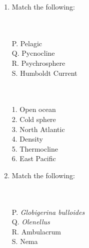 \documentclass[12pt,fleqn]{article}
\theoremstyle{remark}
\begin{document}
\begin{enumerate}[label=Q.\arabic*.]
    \item Match the following: \hfill{} \\
    
\begin{multicols}{2}
            \\\\
            P. Pelagic\\
            Q. Pycnocline\\
            R. Psychrosphere\\
            S. Humboldt Current

            \columnbreak
            
            \\\\
            1. Open ocean\\
            2. Cold sphere\\
            3. North Atlantic\\
            4. Density\\
            5. Thermocline\\
            6. East Pacific

        \end{multicols}
            \begin {enumerate}
            \end{enumerate}
\item Match the following: \hfill{} \\
    
\begin{multicols}{2}
            \\\\
            P. \textit{Globigerina bulloides}\\
            Q. \textit{Olenellus}\\
            R. Ambulacrum\\
            S. Nema


\end{multicols}
\end{enumerate}
\end{document}
